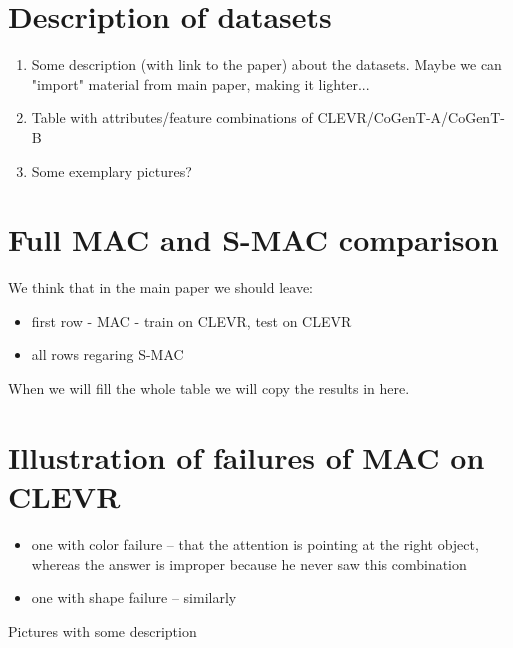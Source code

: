 \appendix

\section{Description of datasets}

\begin{enumerate}
\item Some description (with link to the paper) about the datasets. Maybe we can "import" material from main paper, making it lighter...
\item Table with attributes/feature combinations of CLEVR/CoGenT-A/CoGenT-B
\item Some exemplary pictures?
\end{enumerate}

\section{Full MAC and S-MAC comparison}

We think that in the main paper we should leave:
\begin{itemize}
\item first row - MAC - train on CLEVR, test on CLEVR 
\item all rows regaring S-MAC
\end{itemize}

When we will fill the whole table we will copy the results in here.

\section{Illustration of failures of MAC on CLEVR}

\begin{itemize}
\item one with color failure -- that the attention is pointing at the right object, whereas the answer is improper because he never saw this combination
\item one with shape failure -- similarly	
\end{itemize}
Pictures with some description